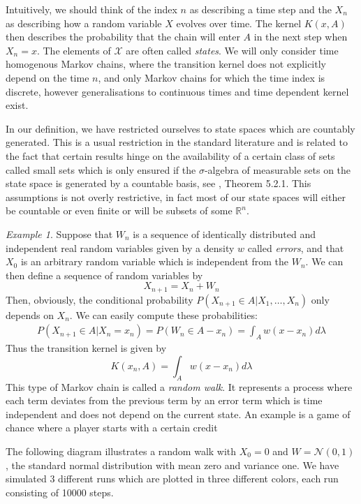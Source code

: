 \documentclass[a4paper, draft]{article}
\theoremstyle{own}
\theoremstyle{remark}
\newtheorem{example}{Example}[section]
\newcommand{\R}{\mathbb{R}}
\begin{document}
Intuitively, we should think of the index $n$ as describing a time step and the $X_n$ as describing how a random variable $X$ evolves over time. The kernel $K(x,A)$ then describes the probability that the chain will enter $A$ in the next step when $X_n = x$. The elements of ${\mathcal X}$ are often called {\em states}. We will only consider time homogenous Markov chains, where the transition kernel does not explicitly depend on the time $n$, and only Markov chains for which the time index is discrete, however generalisations to continuous times and time dependent kernel exist.

In our definition, we have restricted ourselves to state spaces which are countably generated. This is a usual restriction in the standard literature and is related to the fact that certain results hinge on the availability of a certain class of sets called small sets which is only ensured if the $\sigma$-algebra of measurable sets on the state space is generated by a countable basis, see \cite{MeynTweedie}, Theorem 5.2.1. This assumptions is not overly restrictive, in fact most of our state spaces will either be countable or even finite or will be subsets of some $\R^n$. 

\begin{example}\label{ex:simplerandomwalk}
Suppose that $W_n$ is a sequence of identically distributed and independent real random variables given by a density $w$ called {\em errors}, and that $X_0$ is an arbitrary random variable which is independent from the $W_n$. We can then define a sequence of random variables by
$$
X_{n+1} = X_n + W_n
$$
Then, obviously, the conditional probability $P(X_{n+1} \in A | X_1, \dots, X_n)$ only depends on $X_n$.  We can easily compute these probabilities:
\begin{align*}
P(X_{n+1} \in A | X_n = x_n) = P(W_n \in A - x_n) = \int_A w(x - x_n) d\lambda
\end{align*}
Thus the transition kernel is given by
$$
K(x_n,A) = \int_A w(x - x_n)d\lambda
$$
This type of Markov chain is called a {\em random walk}. It represents a process where each term deviates from the previous term by an error term which is time independent and does not depend on the current state. An example is a game of chance where a player starts with a certain credit 
\end{example}

The following diagram illustrates a random walk with $X_0 = 0$ and $W = {\mathcal N}(0,1)$, the standard normal distribution with mean zero and variance one. We have simulated 3 different runs which are plotted in three different colors, each run consisting of 10000 steps. 
\end{document}
